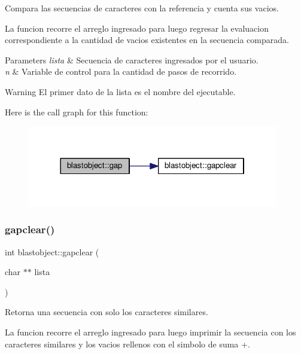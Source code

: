Compara las secuencias de caracteres con la referencia y cuenta sus vacios. 

La funcion recorre el arreglo ingresado para luego regresar la evaluacion correspondiente a la cantidad de vacios existentes en la secuencia comparada.


\begin{DoxyParams}{Parameters}
{\em lista} & Secuencia de caracteres ingresados por el usuario. \\
\hline
{\em n} & Variable de control para la cantidad de pasos de recorrido. \\
\hline
\end{DoxyParams}
\begin{DoxyWarning}{Warning}
El primer dato de la lista es el nombre del ejecutable. 
\end{DoxyWarning}
Here is the call graph for this function\+:
\nopagebreak
\begin{figure}[H]
\begin{center}
\leavevmode
\includegraphics[width=310pt]{classblastobject_ae6ca5436041b743e8c20739a9f59ef91_cgraph}
\end{center}
\end{figure}
\hypertarget{classblastobject_a50f753f559096d95d75ee73ae08b846e}{}\label{classblastobject_a50f753f559096d95d75ee73ae08b846e} 
\subsubsection{\texorpdfstring{gapclear()}{gapclear()}}
{\ttfamily int blastobject\+::gapclear (\begin{DoxyParamCaption}\item[{char $\ast$$\ast$}]{lista }\end{DoxyParamCaption})}



Retorna una secuencia con solo los caracteres similares. 

La funcion recorre el arreglo ingresado para luego imprimir la secuencia con los caracteres similares y los vacios rellenos con el simbolo de suma +.


